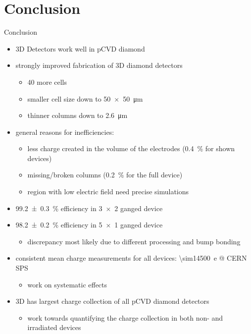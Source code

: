 \section{Conclusion}
\begin{frame}{Conclusion}

		\begin{itemize}\itemfill
			\item 3D Detectors work well in pCVD diamond
			\item strongly improved fabrication of 3D diamond detectors
			\begin{itemize}
				\item \SI{40}{\times} more cells
				\item smaller cell size down to \SI{50x50}{\micro\meter}
				\item thinner columns down to \SI{2.6}{\micro\meter}\vspace*{2ex}
			\end{itemize}
			\item general reasons for inefficiencies:
			\begin{itemize}
				\item less charge created in the volume of the electrodes (\SI{.4}{\%} for shown devices)
				\item missing/broken columns (\SI{.2}{\%} for the full device)
				\item region with low electric field \ra need precise simulations\vspace*{2ex}
			\end{itemize}
			\item \SI{99.2\pm .3}{\%} efficiency in \SI{3x2}{} ganged device
			\item \SI{98.2\pm .2}{\%} efficiency in \SI{5x1}{} ganged device
			\begin{itemize}
				\item discrepancy most likely due to different processing and bump bonding\vspace*{2ex}
			\end{itemize}
			\item consistent mean charge measurements for all devices: \SI{\sim14500}{e} @ CERN SPS
			\begin{itemize}
				\item work on systematic effects\vspace*{2ex}
			\end{itemize}
			\item 3D has largest charge collection of all pCVD diamond detectors
			\begin{itemize}
				\item work towards quantifying the charge collection in both non- and irradiated devices
			\end{itemize}
		\end{itemize}
	
\end{frame}

